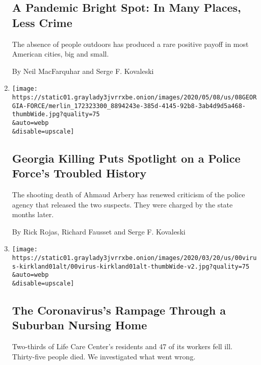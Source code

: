 \begin{enumerate}
{  \subsection{A Pandemic Bright Spot: In Many Places, Less
  Crime}\label{a-pandemic-bright-spot-in-many-places-less-crime}}

  The absence of people outdoors has produced a rare positive payoff in
  most American cities, big and small.

  By Neil MacFarquhar and Serge F. Kovaleski
\item
  \href{/2020/05/08/us/glynn-county-police-ahmaud-arbery.html}{}

  \texttt{[image: https://static01.graylady3jvrrxbe.onion/images/2020/05/08/us/08GEORGIA-FORCE/merlin\_172323300\_8894243e-385d-4145-92b8-3ab4d9d5a468-thumbWide.jpg?quality=75\\\&auto=webp\\\&disable=upscale]}

  \hypertarget{georgia-killing-puts-spotlight-on-a-police-forces-troubled-history}{%
  \subsection{Georgia Killing Puts Spotlight on a Police Force's
  Troubled
  History}\label{georgia-killing-puts-spotlight-on-a-police-forces-troubled-history}}

  The shooting death of Ahmaud Arbery has renewed criticism of the
  police agency that released the two suspects. They were charged by the
  state months later.

  By Rick Rojas, Richard Fausset and Serge F. Kovaleski
\item
  \href{/2020/03/21/us/coronavirus-nursing-home-kirkland-life-care.html}{}

  \texttt{[image: https://static01.graylady3jvrrxbe.onion/images/2020/03/20/us/00virus-kirkland01alt/00virus-kirkland01alt-thumbWide-v2.jpg?quality=75\\\&auto=webp\\\&disable=upscale]}

  \hypertarget{the-coronaviruss-rampage-through-a-suburban-nursing-home}{%
  \subsection{The Coronavirus's Rampage Through a Suburban Nursing
  Home}\label{the-coronaviruss-rampage-through-a-suburban-nursing-home}}

  Two-thirds of Life Care Center's residents and 47 of its workers fell
  ill. Thirty-five people died. We investigated what went wrong.


\end{enumerate}

